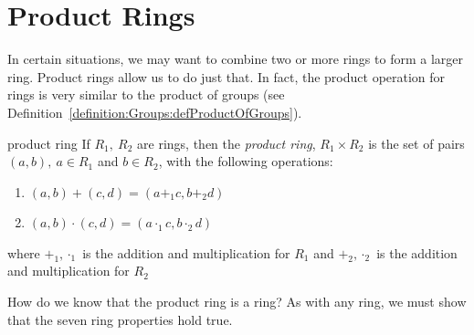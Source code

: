 \section{Product Rings}
\label{sec:Rings:ProductRings}

In certain situations, we may want to combine two or more rings to form a larger ring. Product rings allow us to do just that. In fact, the product operation for rings is very similar to the product of groups (see Definition~\ref{definition:Groups:defProductOfGroups}).

\begin{defn}{product ring}
If $R_1,~R_2$ are rings, then the \emph{product ring}, $R_1\times R_2$ is the set of pairs $(a,b),~a\in R_1$ and $b\in R_2$, with the following operations:
\begin{enumerate}
\item $(a,b)+(c,d)=(a+_1c,b+_2d)$
\item $(a,b)\cdot(c,d)=(a\cdot_1c,b\cdot_2d)$
\end{enumerate}
where $+_1,\cdot_1$ is the addition and multiplication for $R_1$ and $+_2,\cdot_2$ is the addition and multiplication for $R_2$\\
\end{defn}
How do we know that the product ring is a ring? As with any ring, we must show that the seven ring properties hold true.

